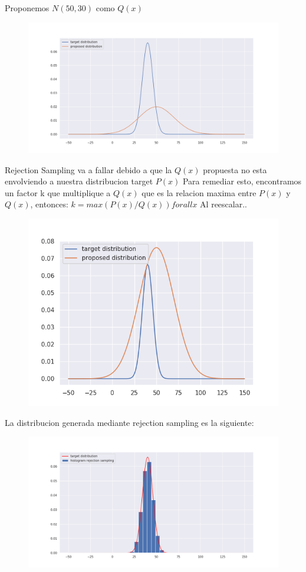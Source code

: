 \documentclass[11pt,a4paper]{article}
\begin{document}
	Proponemos $N(50, 30)$ como $Q(x)$
	\begin{figure}[H]
  			\centering
    			\includegraphics[width=14cm]{imagenes/proposed}
	\end{figure}
	Rejection Sampling va a fallar debido a que la $Q(x)$ propuesta no esta envolviendo a nuestra distribucion target $P(x)$
	Para remediar esto, encontramos un factor k que multiplique a $Q(x)$ que es la relacion maxima entre $P(x)$ y $Q(x)$, entonces:
	$k = max(P(x) / Q(x)) for all x$
	Al reescalar..
	\begin{figure}[H]
  			\centering
    			\includegraphics[width=18cm]{imagenes/proposed_escaled}
	\end{figure}

	La distribucion generada mediante rejection sampling es la siguiente:
	\begin{figure}[H]
  			\centering
    			\includegraphics[width=14cm]{imagenes/rejection_sampling_generated_distribution}
	\end{figure}
\end{document}
